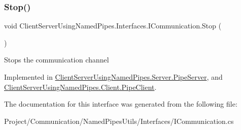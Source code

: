 \subsubsection{\texorpdfstring{Stop()}{Stop()}}
{\footnotesize\ttfamily void Client\+Server\+Using\+Named\+Pipes.\+Interfaces.\+I\+Communication.\+Stop (\begin{DoxyParamCaption}{ }\end{DoxyParamCaption})}



Stops the communication channel 



Implemented in \hyperlink{class_client_server_using_named_pipes_1_1_server_1_1_pipe_server_a37eb41a1b69ab108b9eb5745950b3ab9}{Client\+Server\+Using\+Named\+Pipes.\+Server.\+Pipe\+Server}, and \hyperlink{class_client_server_using_named_pipes_1_1_client_1_1_pipe_client_a9d442b0b2a19c3d460185a8bb27e36e9}{Client\+Server\+Using\+Named\+Pipes.\+Client.\+Pipe\+Client}.



The documentation for this interface was generated from the following file\+:\begin{DoxyCompactItemize}
\item 
Project/\+Communication/\+Named\+Pipes\+Utils/\+Interfaces/I\+Communication.\+cs\end{DoxyCompactItemize}

